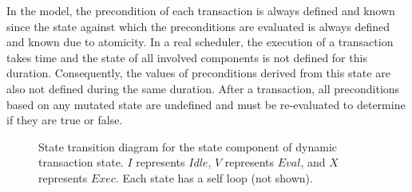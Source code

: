 In the model, the precondition of each transaction is always defined and known since the state against which the preconditions are evaluated is always defined and known due to atomicity.
In a real scheduler, the execution of a transaction takes time and the state of all involved components is not defined for this duration.
Consequently, the values of preconditions derived from this state are also not defined during the same duration.
After a transaction, all preconditions based on any mutated state are undefined and must be re-evaluated to determine if they are true or false.

\begin{figure}
\centering
\caption{State transition diagram for the state component of dynamic transaction state.
  $I$ represents $\mathit{Idle}$, $V$ represents $\mathit{Eval}$, and $X$ represents $\mathit{Exec}$.
  Each state has a self loop (not shown).
  \label{dt_state}}
\end{figure}

